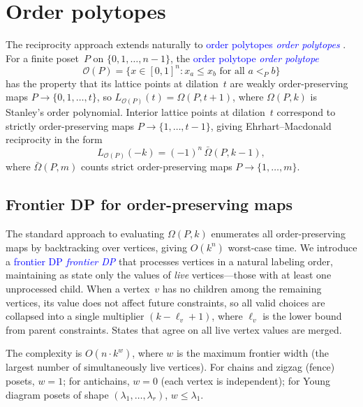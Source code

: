 \documentclass[11pt,reqno]{amsart}
\theoremstyle{definition}
\newcommand{\Ehr}{L}
\newcommand{\defin}[1]{%
\relax\ifmmode%
\textcolor{blue}{#1}%
\else \textcolor{blue}{\emph{#1}}%
\fi%
}
\begin{document}
\section{Order polytopes}\label{sec:orderPolytopes}

The reciprocity approach extends naturally to \defin{order polytopes}.
For a finite poset~$P$ on $\{0,1,\dotsc,n-1\}$, the
\defin{order polytope}~\cite{Stanley1986}
\[
  \mathcal{O}(P) = \bigl\{x \in [0,1]^n : x_a \leq x_b \text{ for all } a <_P b \bigr\}
\]
has the property that its lattice points at dilation~$t$ are weakly
order-preserving maps $P \to \{0,1,\dotsc,t\}$, so
$\Ehr_{\mathcal{O}(P)}(t) = \Omega(P, t+1)$, where $\Omega(P,k)$
is Stanley's order polynomial.  Interior lattice points at dilation~$t$
correspond to strictly order-preserving maps $P \to \{1,\dotsc,t-1\}$,
giving Ehrhart--Macdonald reciprocity in the form
\begin{equation}\label{eq:order-reciprocity}
  \Ehr_{\mathcal{O}(P)}(-k)
  = (-1)^n \, \bar{\Omega}(P, k-1),
\end{equation}
where $\bar{\Omega}(P,m)$ counts strict order-preserving maps
$P \to \{1,\dotsc,m\}$.

\subsection{Frontier DP for order-preserving maps}\label{subs:frontierDP}

The standard approach to evaluating $\Omega(P,k)$ enumerates all
order-preserving maps by backtracking over vertices, giving
$O(k^n)$ worst-case time.  We introduce a \defin{frontier DP} that
processes vertices in a natural labeling order, maintaining as state
only the values of \emph{live} vertices---those with at least one
unprocessed child.  When a vertex~$v$ has no children among the
remaining vertices, its value does not affect future constraints,
so all valid choices are collapsed into a single multiplier
$(k - \ell_v + 1)$, where $\ell_v$ is the lower bound from parent
constraints.  States that agree on all live vertex values are merged.

The complexity is $O(n \cdot k^{w})$, where $w$ is the maximum
frontier width (the largest number of simultaneously live vertices).
For chains and zigzag (fence) posets, $w = 1$; for antichains,
$w = 0$ (each vertex is independent); for Young diagram posets of
shape $(\lambda_1, \dotsc, \lambda_r)$, $w \leq \lambda_1$.
\end{document}
